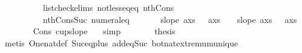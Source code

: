 \begin{isabellebody}
\ \ \ \ \ \ \ \ \ \ list{\isacharunderscore}{\kern0pt}check{\isachardot}{\kern0pt}elims{\isacharparenleft}{\kern0pt}{}{\isacharparenright}{\kern0pt}\ not{\isacharunderscore}{\kern0pt}less{\isacharunderscore}{\kern0pt}eq{\isacharunderscore}{\kern0pt}eq\ nth{\isacharunderscore}{\kern0pt}Cons{\isacharunderscore}{\kern0pt}{}\isanewline
\ \ \ \ \ \ \ \ \ \ nth{\isacharunderscore}{\kern0pt}Cons{\isacharunderscore}{\kern0pt}Suc\ numeral{\isacharunderscore}{\kern0pt}{}{\isacharunderscore}{\kern0pt}eq{\isacharunderscore}{\kern0pt}{}{\isacharparenright}{\kern0pt}\ \isanewline
\ \ \ \ \isamarkupfalse%
\ {\isachardoublequoteopen}slope\ {\isacharparenleft}{\kern0pt}{\isacharparenleft}{\kern0pt}a{\isacharhash}{\kern0pt}xs{\isacharparenright}{\kern0pt}\ {\isacharbang}{\kern0pt}\ {}{\isacharparenright}{\kern0pt}\ {\isacharparenleft}{\kern0pt}{\isacharparenleft}{\kern0pt}a{\isacharhash}{\kern0pt}xs{\isacharparenright}{\kern0pt}\ {\isacharbang}{\kern0pt}\ {\isacharparenleft}{\kern0pt}{}{\isacharparenright}{\kern0pt}{\isacharparenright}{\kern0pt}\ {\isacharless}{\kern0pt}\ slope\ {\isacharparenleft}{\kern0pt}{\isacharparenleft}{\kern0pt}a{\isacharhash}{\kern0pt}xs{\isacharparenright}{\kern0pt}\ {\isacharbang}{\kern0pt}\ {\isacharparenleft}{\kern0pt}{}{\isacharparenright}{\kern0pt}{\isacharparenright}{\kern0pt}\ {\isacharparenleft}{\kern0pt}{\isacharparenleft}{\kern0pt}a{\isacharhash}{\kern0pt}xs{\isacharparenright}{\kern0pt}\ {\isacharbang}{\kern0pt}\ {\isacharparenleft}{\kern0pt}{}{\isacharparenright}{\kern0pt}{\isacharparenright}{\kern0pt}{\isachardoublequoteclose}\isanewline
\ \ \ \ \ \ \isamarkupfalse%
\ Cons{\isacharparenleft}{\kern0pt}{}{\isacharparenright}{\kern0pt}\ cup{}{\isacharunderscore}{\kern0pt}slope\ {}\ \isamarkupfalse%
\ simp\isanewline
\isanewline
\ \ \ \ \isamarkupfalse%
\ \isamarkupfalse%
\ {\isacharquery}{\kern0pt}thesis\ \isamarkupfalse%
\ {}\ {}\ {}\isanewline
\ \ \ \ \ \ \isamarkupfalse%
\ {\isacharparenleft}{\kern0pt}metis\ One{\isacharunderscore}{\kern0pt}nat{\isacharunderscore}{\kern0pt}def\ Suc{\isacharunderscore}{\kern0pt}eq{\isacharunderscore}{\kern0pt}plus{}\ add{\isacharunderscore}{\kern0pt}{}{\isacharunderscore}{\kern0pt}eq{\isacharunderscore}{\kern0pt}Suc{\isacharprime}{\kern0pt}\ bot{\isacharunderscore}{\kern0pt}nat{\isacharunderscore}{\kern0pt}{}{\isachardot}{\kern0pt}extremum{\isacharunderscore}{\kern0pt}unique\isanewline

\end{isabellebody}
